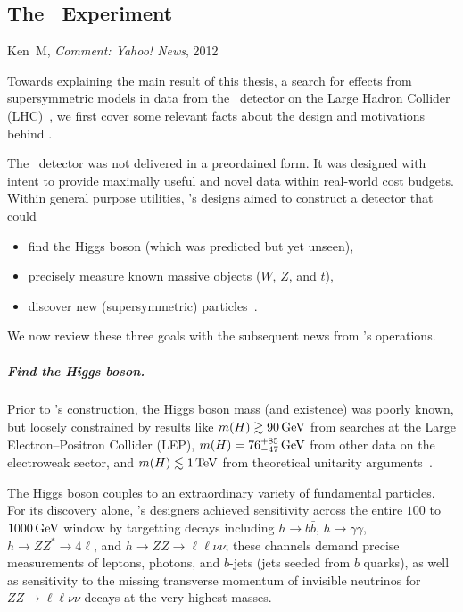 \begin{singlespacing}
\chapter{The \atlas\ Experiment}
\label{chapter:experiment}
%
\begin{epigraphs}
%
{Ken~M,
\textit{Comment: Yahoo! News},
2012~\cite{kenm2012inner}}
\end{epigraphs}
\end{singlespacing}

Towards explaining the main result of this thesis,
a search for effects from supersymmetric models
in data from the \atlas\ detector
on the Large Hadron Collider (LHC)~\cite{
atlas2022searches,
atlas2008experiment,
lhc2008machine
},
we first cover some relevant facts about the design and motivations
behind \atlas.

The \atlas\ detector was not delivered in a preordained form.
It was designed with intent to provide maximally useful and novel data within
real-world cost budgets.
Within general purpose utilities, \atlas's designs aimed to construct a
detector that could
\begin{itemize}
\item find the Higgs boson (which was predicted but yet unseen),
\item precisely measure known massive objects ($W$, $Z$, and $t$),
\item discover new (supersymmetric) particles~\cite{atlas1999design1}.
\end{itemize}
We now review these three goals with the subsequent news from \atlas's
operations.

\paragraph{Find the Higgs boson.}
Prior to \atlas's construction, the Higgs boson mass (and existence) was
poorly known, but loosely constrained by results like
$m(H) \gtrsim 90\,\eV[G]$ from searches at the
Large Electron–Positron Collider (LEP),
$m(H) = 76^{+85}_{-47}\,\eV[G]$ from other data on the electroweak sector,
and $m(H) \lesssim 1\,\eV[T]$ from theoretical unitarity arguments~\cite{
atlas1999design2,
ghinculov1998perturb,
lep1999ewk
}.

The Higgs boson couples to an extraordinary variety of fundamental particles.
For its discovery alone, \atlas's designers achieved sensitivity across the
entire $100$ to $1000\,\eV[G]$ window by targetting decays including
$h \to b\bar b$,
$h \to \gamma\gamma$,
$h \to ZZ^* \to 4\ell$, and
$h \to ZZ \to \ell\ell\nu\nu$;
these channels demand precise measurements of leptons, photons, and
$b$-jets (jets seeded from $b$ quarks), as well as sensitivity to the missing
transverse momentum of invisible neutrinos for $ZZ \to \ell\ell\nu\nu$ decays
at the very highest masses.

